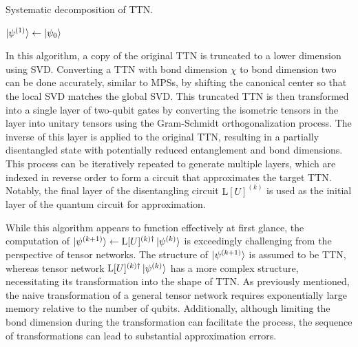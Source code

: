 \documentclass[12pt,dvipdfmx,twoside,openright]{report}
\begin{document}
\begin{algorithm}[tbp]
 \caption{Systematic decomposition of TTN.}
 \label{algorithm:decomposition}
 $\ket{\psi^{(1)}} \leftarrow{\ket{\psi_0}}$\;
\end{algorithm}

In this algorithm, a copy of the original TTN is truncated to a lower dimension using SVD.
Converting a TTN with bond dimension $\chi$ to bond dimension two can be done accurately, similar to MPSs, by shifting the canonical center so that the local SVD matches the global SVD.
This truncated TTN is then transformed into a single layer of two-qubit gates by converting the isometric tensors in the layer into unitary tensors using the Gram-Schmidt orthogonalization process.
 The inverse of this layer is applied to the original TTN, resulting in a partially disentangled state with potentially reduced entanglement and bond dimensions.
This process can be iteratively repeated to generate multiple layers, which are indexed in reverse order to form a circuit that approximates the target TTN. 
Notably, the final layer of the disentangling circuit $\mathrm{L}[U]^{(k)}$ is used as the initial layer of the quantum circuit for approximation.

While this algorithm appears to function effectively at first glance, the computation of $\ket{\psi^{(k+1)}} \leftarrow{\mathrm{L}[U]^{(k)\dagger}}\ket{\psi^{(k)}}$ is exceedingly challenging from the perspective of tensor networks.
The structure of $\ket{\psi^{(k+1)}}$ is assumed to be TTN, whereas tensor network $\mathrm{L}[U]^{(k)\dagger}\ket{\psi^{(k)}}$ has a more complex structure, necessitating its transformation into the shape of TTN.
As previously mentioned, the naive transformation of a general tensor network requires exponentially large memory relative to the number of qubits.
Additionally, although limiting the bond dimension during the transformation can facilitate the process, the sequence of transformations can lead to substantial approximation errors.
\end{document}
